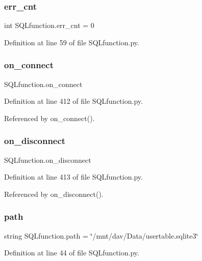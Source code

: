 \subsubsection{err\+\_\+cnt}
{\footnotesize\ttfamily int S\+Q\+Lfunction.\+err\+\_\+cnt = 0}



Definition at line 59 of file S\+Q\+Lfunction.\+py.

\mbox{\label{namespace_s_q_lfunction_a215e7090f82fbf0d31fd97be6721389a}} 
\subsubsection{on\+\_\+connect}
{\footnotesize\ttfamily S\+Q\+Lfunction.\+on\+\_\+connect}



Definition at line 412 of file S\+Q\+Lfunction.\+py.



Referenced by on\+\_\+connect().

\mbox{\label{namespace_s_q_lfunction_ab3031ccbbdb3f5a04bd7d66ceb4494c7}} 
\subsubsection{on\+\_\+disconnect}
{\footnotesize\ttfamily S\+Q\+Lfunction.\+on\+\_\+disconnect}



Definition at line 413 of file S\+Q\+Lfunction.\+py.



Referenced by on\+\_\+disconnect().

\mbox{\label{namespace_s_q_lfunction_a9239421845b9e0921bad7a2a191f3849}} 
\subsubsection{path}
{\footnotesize\ttfamily string S\+Q\+Lfunction.\+path = \char`\"{}/mnt/dav/Data/usertable.\+sqlite3\char`\"{}}



Definition at line 44 of file S\+Q\+Lfunction.\+py.

